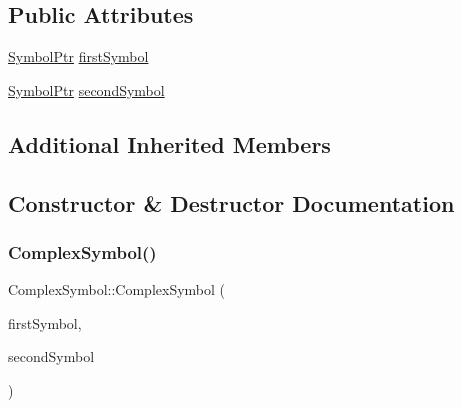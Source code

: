 \subsection*{Public Attributes}
\begin{DoxyCompactItemize}
\item 
\mbox{\hyperlink{namespace_erable_1_1_compiler_1_1_symbols_a8f0bc762f448ea4d84e8713ab3e140b9}{Symbol\+Ptr}} \mbox{\hyperlink{class_erable_1_1_compiler_1_1_symbols_1_1_complex_symbol_a7fe7c20f27d1f04fb24c6070c53747ad}{first\+Symbol}}
\item 
\mbox{\hyperlink{namespace_erable_1_1_compiler_1_1_symbols_a8f0bc762f448ea4d84e8713ab3e140b9}{Symbol\+Ptr}} \mbox{\hyperlink{class_erable_1_1_compiler_1_1_symbols_1_1_complex_symbol_ac913a7c0d6b7d08f76516e84d79b3e2b}{second\+Symbol}}
\end{DoxyCompactItemize}
\subsection*{Additional Inherited Members}


\subsection{Constructor \& Destructor Documentation}
\mbox{\label{class_erable_1_1_compiler_1_1_symbols_1_1_complex_symbol_a706f187f6fbad0b424fe394f0dd80da9}} 
\subsubsection{\texorpdfstring{ComplexSymbol()}{ComplexSymbol()}}
{\footnotesize\ttfamily Complex\+Symbol\+::\+Complex\+Symbol (\begin{DoxyParamCaption}\item[{\mbox{\hyperlink{namespace_erable_1_1_compiler_1_1_symbols_a8f0bc762f448ea4d84e8713ab3e140b9}{Symbol\+Ptr}} \&\&}]{first\+Symbol,  }\item[{\mbox{\hyperlink{namespace_erable_1_1_compiler_1_1_symbols_a8f0bc762f448ea4d84e8713ab3e140b9}{Symbol\+Ptr}} \&\&}]{second\+Symbol }\end{DoxyParamCaption})}



